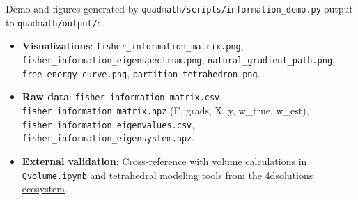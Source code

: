 \documentclass[
  10pt,
]{article}
\providecommand{\tightlist}{%
  \setlength{\itemsep}{0pt}\setlength{\parskip}{0pt}}
\begin{document}
Demo and figures generated by
\texttt{quadmath/scripts/information\_demo.py} output to
\texttt{quadmath/output/}:

\begin{itemize}
\tightlist
\item
  \textbf{Visualizations}: \texttt{fisher\_information\_matrix.png},
  \texttt{fisher\_information\_eigenspectrum.png},
  \texttt{natural\_gradient\_path.png},
  \texttt{free\_energy\_curve.png}, \texttt{partition\_tetrahedron.png}.
\item
  \textbf{Raw data}: \texttt{fisher\_information\_matrix.csv},
  \texttt{fisher\_information\_matrix.npz} (F, grads, X, y, w\_true,
  w\_est), \texttt{fisher\_information\_eigenvalues.csv},
  \texttt{fisher\_information\_eigensystem.npz}.
\item
  \textbf{External validation}: Cross-reference with volume calculations
  in
  \href{https://github.com/4dsolutions/School_of_Tomorrow/blob/master/Qvolume.ipynb}{\texttt{Qvolume.ipynb}}
  and tetrahedral modeling tools from the
  \href{https://github.com/4dsolutions}{4dsolutions ecosystem}.
\end{itemize}
\end{document}
